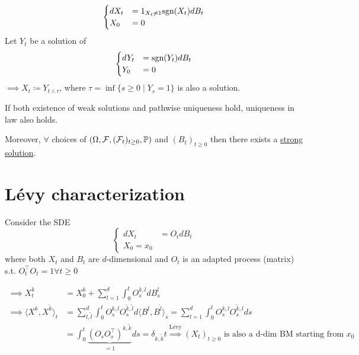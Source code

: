 \begin{example}\label{ex:1.9}
    \[\begin{cases}
        dX_t&=1_{X_t\neq 1}\text{sgn}(X_t)dB_t\\
        X_0&=0
    \end{cases}\]
    Let $Y_t$ be a solution of \[\begin{cases}
        dY_t&=\text{sgn}(Y_t)dB_t\\
        Y_0&=0
    \end{cases}\]
    $\implies X_t\coloneqq Y_{t\land \tau}$, where $\tau=\inf\{s\geq 0\mid Y_s=1\}$ is also a solution.
\end{example}

\begin{theorem}\label{thm:1.10-Yamada-Watanabe}
    If both existence of weak solutions and pathwise uniqueness hold, uniqueness in law also holds.
    
    Moreover, $\forall$ choices of $(\Omega,\mathcal{F},(\mathcal{F}_t)_{t\geq 0},\mathbb{P})$ and $(B_t)_{t\geq 0}$ then there exists a \hyperref[def:strong_solution]{strong solution}.
\end{theorem}

\section{Lévy characterization}

\begin{example}\label{ex:1.11}
    Consider the SDE 
    \[\begin{cases}
        dX_t&=O_tdB_t\\
        X_0=x_0
    \end{cases}\]
    where both $X_t$ and $B_t$ are $d$-dimensional and 
    $O_t$ is an adapted process (matrix) s.t. $O_t^\intercal O_t=1\forall t\geq 0$

    \begin{align*}
        \implies X_t^k& = X_0^k+\sum_{l=1}^d\int_0^t O_s^{k,l}dB_s^l\\
        \implies \langle X^k,X^{\tilde{k}}\rangle_t&=\sum_{l,\tilde{l}}^d\int_0^tO_s^{k,l}O_s^{\tilde{k},\tilde{l}}d\langle B^l,B^{\tilde{l}}\rangle_s=\sum_{l=1}^d\int_0^t O_s^{k,l}O_s^{\tilde{k},l}ds \\
        &=\int_0^t \underbrace{\left(O_sO_s^\intercal\right)^{k,\tilde{k}}}_{=1}ds=\delta_{k,\tilde{k}}t\stackrel{\text{Lévy}}{\implies} (X_t)_{t\geq 0} \text{ is also a d-dim BM starting from } x_0
    \end{align*}

\end{example}

